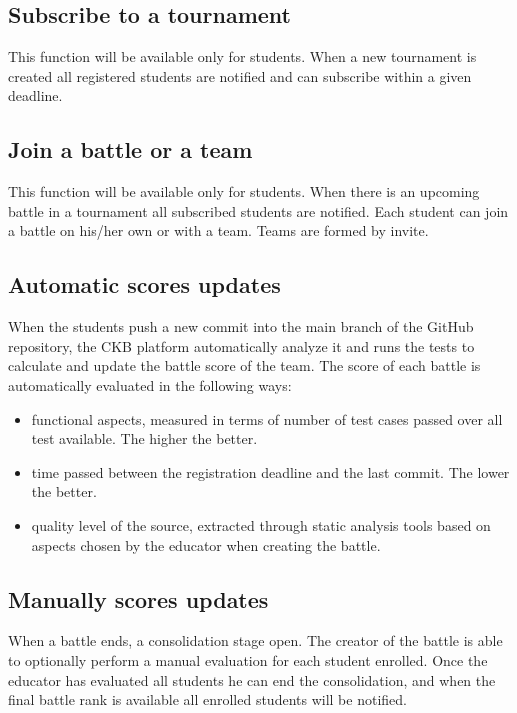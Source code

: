 \subsection{Subscribe to a tournament}
This function will be available only for students. \newline When a new tournament is created all registered students are notified and can subscribe within a given deadline.

\subsection{Join a battle or a team}
This function will be available only for students. \newline When there is an upcoming battle in a tournament all subscribed students are notified. Each student can join a battle on his/her own or with a team. Teams are formed by invite.

\subsection{Automatic scores updates}
When the students push a new commit into the main branch of the GitHub repository, the CKB platform automatically analyze it and runs the tests to calculate and update the battle score of the team.\newline
The score of each battle is automatically evaluated in the following ways:
\begin{itemize}
        \item functional aspects, measured in terms of number of test cases passed over all test available. The higher the better.
        \item time passed between the registration deadline and the last commit. The lower the better.
        \item quality level of the source, extracted through static analysis tools based on aspects chosen by the educator when creating the battle. 
\end{itemize}

\subsection{Manually scores updates}
When a battle ends, a consolidation stage open. The creator of the battle is able to optionally perform a manual evaluation for each student enrolled.
Once the educator has evaluated all students he can end the consolidation, and when the final battle rank is available all enrolled students will be notified.

